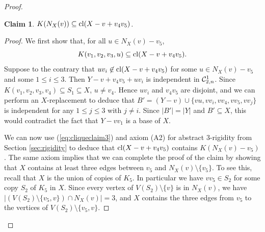 \documentclass{daj}
\newtheorem{claim}[thm]{Claim}\theoremstyle{plain}
\begin{document}
\begin{proof}
\begin{claim}\label{claim:cliqueNXv}
$K(N_X(v))\subseteq {\rm cl}(X-v+v_4v_5)$.
\end{claim}
\begin{proof}
We first show  that, for all $u\in N_X(v)-v_5$,
\begin{equation}
\label{eq:cliqueclaim3}
\text{$K(v_1,v_2,v_3,u)\subseteq {\rm cl}(X-v+v_4v_5)$.}
\end{equation}
Suppose to the contrary that $uv_i\not\in {\rm cl}(X-v+v_4v_5)$ for some $u\in N_X(v)-v_5$ and some $1\leq i\leq 3$.
Then $Y-v+v_4v_5+uv_i$ is independent in ${\cal C}_{2,n}^1$. 
Since $K(v_1,v_2,v_3,v_4)\subseteq S_1\subseteq X$, $u\neq v_4$.
Hence $uv_i$ and $v_4v_5$ are disjoint, and we
can perform an $X$-replacement to deduce that $B'=(Y-v)\cup \{vu,vv_i,vv_4,vv_5,vv_j\}$ is independent for any $1\leq j\leq 3$ with $j\neq i$. 
Since $|B'|=|Y|$ and $B'\subseteq X$, this would contradict the fact that $Y-vv_1$ is a base of $X$.

We can now use (\ref{eq:cliqueclaim3}) and axiom (A2) for abstract 3-rigidity from Section \ref{sec:rigidity} to deduce that
${\rm cl}(X-v+v_4v_5)$ contains $K(N_X(v)-v_5)$.  The same axiom implies that we can complete the proof of the claim by showing that $X$ contains at least three edges between $v_5$ and $N_X(v)\setminus \{v_5\}$.
To see this, recall that $X$ is the union of copies of $K_5$.
In particular we have $vv_5\in S_2$ for some copy $S_2$   of $K_5$ in $X$. Since every vertex of $V(S_2)\setminus \{v\}$ is in $N_X(v)$, we have $|(V(S_2)\setminus \{v_5,v\})\cap N_X(v)|=3$,
and $X$ contains the three edges from $v_5$ to the vertices of $V(S_2)\setminus\{v_5,v\}$.
\end{proof}



\end{proof}
\end{document}
